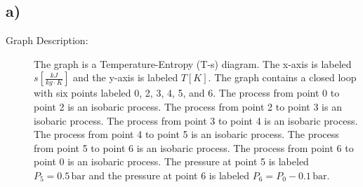 

\subsection*{a)}

\begin{description}
    \item[Graph Description:] The graph is a Temperature-Entropy (T-s) diagram. The x-axis is labeled $s \left[ \frac{kJ}{kg \cdot K} \right]$ and the y-axis is labeled $T \left[ K \right]$. The graph contains a closed loop with six points labeled 0, 2, 3, 4, 5, and 6. The process from point 0 to point 2 is an isobaric process. The process from point 2 to point 3 is an isobaric process. The process from point 3 to point 4 is an isobaric process. The process from point 4 to point 5 is an isobaric process. The process from point 5 to point 6 is an isobaric process. The process from point 6 to point 0 is an isobaric process. The pressure at point 5 is labeled $P_5 = 0.5 \, \text{bar}$ and the pressure at point 6 is labeled $P_6 = P_0 - 0.1 \, \text{bar}$.
\end{description}